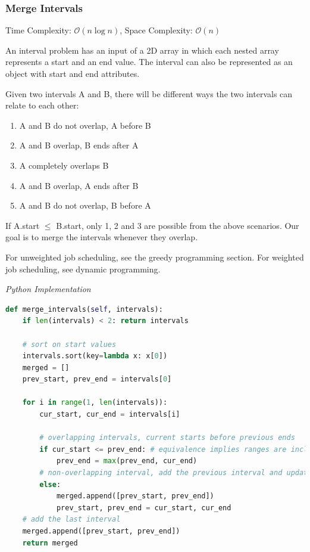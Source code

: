 \documentclass{article}
\newcommand{\bigO}{\mathcal{O}}
\begin{document}
    \subsubsection{Merge Intervals}
    Time Complexity: $\bigO(n \log n)$, Space Complexity: $\bigO(n)$
    
    An interval problem has an input of a 2D array in which each nested array represents a start and an end value. The interval can also be represented as an object with start and end attributes.
    
    Given two intervals A and B, there will be different ways the two intervals can relate to each other:
    \begin{enumerate}
        \item A and B do not overlap, A before B
        \item A and B overlap, B ends after A
        \item A completely overlaps B
        \item A and B overlap, A ends after B
        \item  A and B do not overlap, B before A
    \end{enumerate}
    If A.start $\leq$ B.start, only 1, 2 and 3 are possible from the above scenarios.  Our goal is to merge the intervals whenever they overlap. 
    
    For unweighted job scheduling, see the greedy programming section. For weighted job scheduling, see dynamic programming. 
    
\vspace{8pt} \emph{Python Implementation}
\begin{lstlisting}[language=Python]
def merge_intervals(self, intervals):
    if len(intervals) < 2: return intervals

    # sort on start values
    intervals.sort(key=lambda x: x[0])
    merged = []
    prev_start, prev_end = intervals[0]

    for i in range(1, len(intervals)):
        cur_start, cur_end = intervals[i]
        
        # overlapping intervals, current starts before previous ends
        if cur_start <= prev_end: # equivalence implies ranges are inclusive
            prev_end = max(prev_end, cur_end)
        # non-overlapping interval, add the previous interval and update
        else:  
            merged.append([prev_start, prev_end])
            prev_start, prev_end = cur_start, cur_end
    # add the last interval
    merged.append([prev_start, prev_end]) 
    return merged
\end{lstlisting}
    
\end{document}
